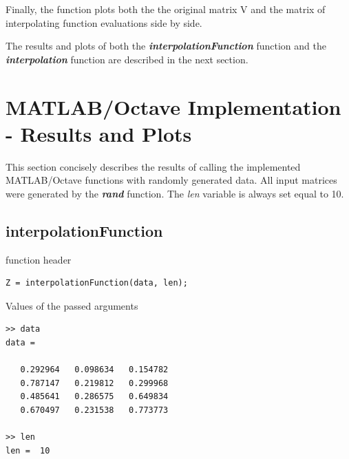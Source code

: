 \documentclass[fleqn]{article}
\begin{document}
Finally, the function plots both the the original matrix V and the matrix of interpolating function evaluations side by side.

The results and plots of both the \textbf{\textit{interpolationFunction}} function and the \textbf{\textit{interpolation}} function are described in the next section.

\section{MATLAB/Octave Implementation - Results and Plots}

This section concisely describes the results of calling the implemented MATLAB/Octave functions with randomly generated data. All input matrices were generated by the \textbf{\textit{rand}} function. The \textit{len} variable is always set equal to 10.

\subsection{interpolationFunction}

function header
\begin{tcolorbox}
\begin{verbatim}
Z = interpolationFunction(data, len);
\end{verbatim}
\end{tcolorbox}

Values of the passed arguments

\begin{tcolorbox}
\begin{verbatim}
>> data
data =

   0.292964   0.098634   0.154782
   0.787147   0.219812   0.299968
   0.485641   0.286575   0.649834
   0.670497   0.231538   0.773773

>> len
len =  10
\end{verbatim}
\end{tcolorbox}
\end{document}
